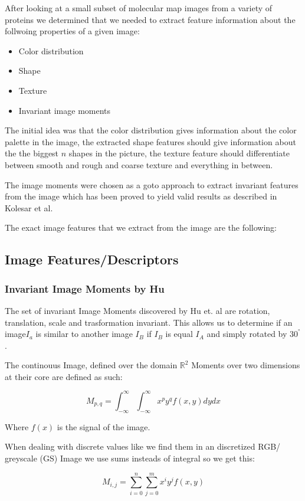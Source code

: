 \documentclass[journal]{vgtc}       %
\begin{document}
After looking at a small subset of molecular map images from a variety of proteins we determined that we needed to extract feature information about the follwoing properties of a given image: 
\begin{itemize}
  \item Color distribution
  \item Shape
  \item Texture
  \item Invariant  image moments 
\end{itemize}


The initial idea was that the color distribution gives information about the color palette in the image, the extracted shape features should give information about the the biggest \( n \) shapes in the picture, the texture feature should differentiate between smooth and rough and coarse texture and everything in between.

The image moments were chosen as a goto approach to extract invariant features from the image which has been proved to yield valid results as described in Kolesar et al. \cite{kolesar}

The exact image features that we extract from the image are the following:
\subsection{Image Features/Descriptors} 
\subsubsection{Invariant Image Moments by Hu}\label{subsec:humom}

The set of invariant Image Moments discovered by Hu et. al  are rotation, translation, scale and trasformation  invariant. This allows us to determine if an image$I_a$ is similar to another image $I_B$ if $I_B$ is equal $I_A$ and simply rotated by $30^°$.

The continouus  Image, defined over the domain \(\mathbb{R}^2\) Moments  over two dimensions at their core are defined as such:

\[M_{p,q} = \int^\infty_{- \infty}\int^\infty_{- \infty} x^py^q f(x,y) dy dx \]

Where \(f(x)\) is the signal of the image. 

When dealing with discrete values like we find them in an discretized RGB/ greyscale (GS) Image we use sums insteads of integral so we get this:

\[M_{i,j} = \sum^n_{i=0}\sum^m_{j=0} x^i y^j f(x,y) \]
\end{document}
